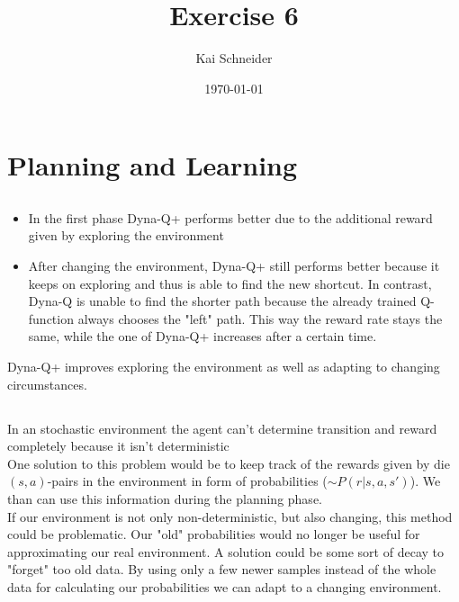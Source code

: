 \documentclass[11pt,a4paper]{article}
\title{Exercise 6}
\author{Kai Schneider}
\date{\today}
\begin{document}
 

\maketitle

\section{Planning and Learning}

\subsection{}

\begin{itemize}
  \item In the first phase Dyna-Q+ performs better due to the additional reward given by exploring the environment
  \item After changing the environment, Dyna-Q+ still performs better because it keeps on exploring and thus is able to find
  the new shortcut. In contrast, Dyna-Q is unable to find the shorter path because the already trained Q-function always chooses
  the "left" path. This way the reward rate stays the same, while the one of Dyna-Q+ increases after a certain time.
\end{itemize}
Dyna-Q+ improves exploring the environment as well as adapting to changing circumstances.

\subsection{}

In an stochastic environment the agent can't determine transition and reward completely because it isn't deterministic\\
One solution to this problem would be to keep track of the rewards given by die $(s,a)$-pairs in the environment in form of 
probabilities ($\sim P(r|s,a,s')$). We than can use this information during the planning phase.\\
If our environment is not only non-deterministic, but also changing, this method could be problematic. Our "old" probabilities
would no longer be useful for approximating our real environment. A solution could be some sort of decay to "forget" too old data. 
By using only a few newer samples instead of the whole data for calculating our probabilities we can adapt to a changing environment.

\newpage
\end{document}
